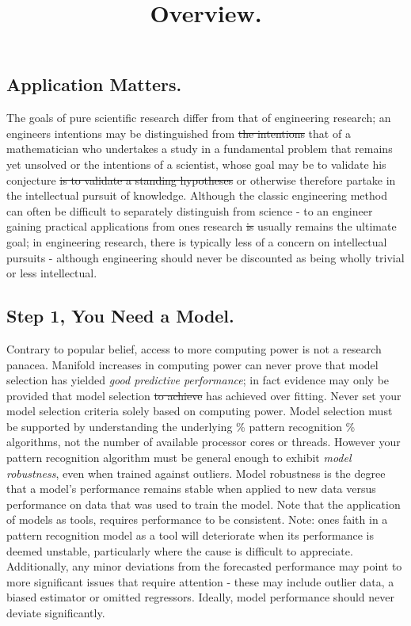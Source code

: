 \documentclass[10pt]{article}[draft]
\begin{document}
\title{Overview.}
\date{}
\maketitle


\begin{center}
\section{Application Matters.}
\end{center}
	
The goals of pure scientific research differ from that of engineering research; an engineers intentions may be distinguished from \st{the intentions} that of a mathematician who undertakes a study in a fundamental problem that remains yet unsolved or the intentions of a scientist, whose goal may be to validate his conjecture \st{is to validate a standing hypotheses} or otherwise therefore partake in the intellectual pursuit of knowledge. Although the classic engineering method can often be difficult to separately distinguish from science - to an engineer gaining practical applications from ones research \st{is} usually remains the ultimate goal; in engineering research, there is typically less of a concern on intellectual pursuits - although engineering should never be discounted as being wholly trivial or less intellectual.  
\vspace{0.25in}

\subsection{Step 1, You Need a Model.}
Contrary to popular belief, access to more computing power is not a research panacea. Manifold increases in computing power can never prove that model selection has yielded \emph{good predictive performance}; in fact evidence may only be provided that model selection \st{to achieve} has achieved over fitting. Never set your model selection criteria solely based on computing power. Model selection must be supported by understanding the underlying  \% pattern recognition \% algorithms, not the number of available processor cores or threads. However your pattern recognition algorithm  must be general enough to exhibit \emph{model robustness}, even when trained against outliers. Model robustness is the degree that a model’s performance remains stable when applied to new data versus performance on data that was used to train the model.  Note that the application of models as tools, requires performance to be consistent.  Note: ones faith in a pattern recognition model as a tool will deteriorate when its performance is deemed unstable, particularly where the cause is difficult to appreciate. Additionally, any minor deviations from the forecasted performance may point to more significant issues that require attention - these may include outlier data, a biased estimator or omitted regressors. Ideally, model performance should never deviate significantly.     
\end{document}
